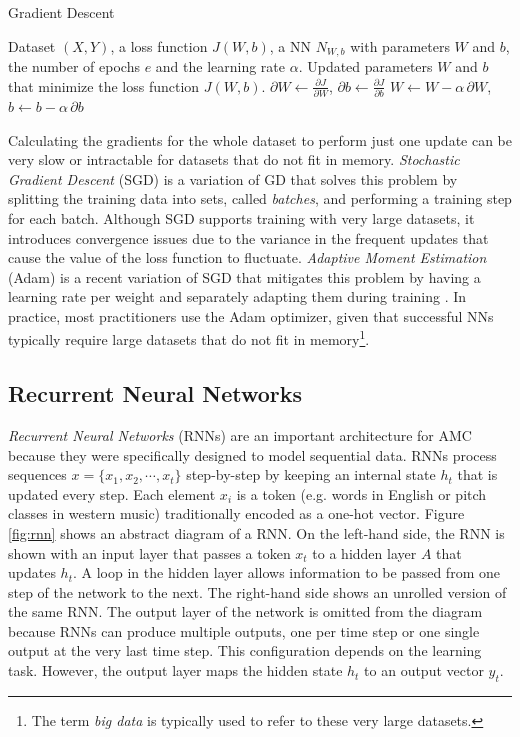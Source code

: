 \begin{algorithm}[t]
\caption{Gradient Descent}
\label{alg:grad_desc}
\begin{algorithmic}[1]
\REQUIRE Dataset $(X, Y)$, a loss function $J(W,b)$, a NN $N_{W,b}$ with
parameters $W$ and $b$, the number of epochs $e$ and the learning rate $\alpha$.
\ENSURE Updated parameters $W$ and $b$ that minimize the loss function $J(W,b)$.
       \STATE $\partial W \gets \frac{\partial J}{\partial W}$, $\partial b \gets \frac{\partial J}{\partial b}$ \label{line:grad}
       \STATE $W \gets W - \alpha \, \partial W$, $b \gets b - \alpha \, \partial b$ \label{line:update}
\ENDFOR
\end{algorithmic}
\end{algorithm}

Calculating the gradients for the whole dataset to perform just one update can be very slow or intractable for datasets that do not fit in memory. \textit{Stochastic Gradient Descent} (SGD) is a variation of GD that solves this problem by splitting the training data into sets, called \textit{batches}, and performing a training step for each batch. Although SGD supports training with very large datasets, it introduces convergence issues due to the variance in the frequent updates that cause the value of the loss function to fluctuate. \textit{Adaptive Moment Estimation} (Adam) is a recent variation of SGD that mitigates this problem by having a learning rate per weight and separately adapting them during training \cite{adam14}. In practice, most practitioners use the Adam optimizer, given that successful NNs typically require large datasets that do not fit in memory\footnote{The term \textit{big data} is typically used to refer to these very large datasets.}.

\subsection{Recurrent Neural Networks}
\label{sec:rnns}

\textit{Recurrent Neural Networks} (RNNs) are an important architecture for AMC because they were specifically designed to model sequential data. RNNs process sequences $x = \{x_1, x_2, \cdots, x_t\}$ step-by-step by keeping an internal state $h_t$ that is updated every step. Each element $x_i$ is a token (e.g. words in English or pitch classes in western music) traditionally encoded as a one-hot vector. Figure \ref{fig:rnn} shows an abstract diagram of a RNN. On the left-hand side, the RNN is shown with an input layer that passes a token $x_t$ to a hidden layer $A$ that updates $h_t$. A loop in the hidden layer allows information to be passed from one step of the network to the next. The right-hand side shows an unrolled version of the same RNN. The output layer of the network is omitted from the diagram because RNNs can produce multiple outputs, one per time step or one single output at the very last time step. This configuration depends on the learning task. However, the output layer maps the hidden state $h_t$ to an output vector $y_t$.

